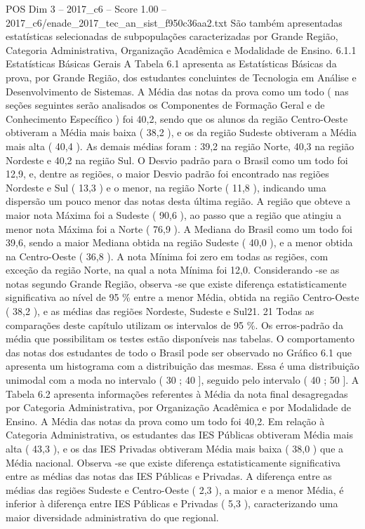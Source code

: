 \begin{textsample}{POS Dim 3 – 2017\_c6 – Score 1.00 – 2017\_c6/enade\_2017\_tec\_an\_sist\_f950c36aa2.txt}
São também apresentadas estatísticas selecionadas de subpopulações caracterizadas por Grande Região, Categoria Administrativa, Organização Acadêmica e Modalidade de Ensino. 6.1.1 Estatísticas Básicas Gerais A Tabela 6.1 apresenta as Estatísticas Básicas da prova, por Grande Região, dos estudantes concluintes de Tecnologia em Análise e Desenvolvimento de Sistemas.
A Média das notas da prova como um todo ( nas seções seguintes serão analisados os Componentes de Formação Geral e de Conhecimento Específico ) foi 40,2, sendo que os alunos da região Centro-Oeste obtiveram a Média mais baixa ( 38,2 ), e os da região Sudeste obtiveram a Média mais alta ( 40,4 ).
As demais médias foram : 39,2 na região Norte, 40,3 na região Nordeste e 40,2 na região Sul.
O Desvio padrão para o Brasil como um todo foi 12,9, e, dentre as regiões, o maior Desvio padrão foi encontrado nas regiões Nordeste e Sul ( 13,3 ) e o menor, na região Norte ( 11,8 ), indicando uma dispersão um pouco menor das notas desta última região.
A região que obteve a maior nota Máxima foi a Sudeste ( 90,6 ), ao passo que a região que atingiu a menor nota Máxima foi a Norte ( 76,9 ).
A Mediana do Brasil como um todo foi 39,6, sendo a maior Mediana obtida na região Sudeste ( 40,0 ), e a menor obtida na Centro-Oeste ( 36,8 ).
A nota Mínima foi zero em todas as regiões, com exceção da região Norte, na qual a nota Mínima foi 12,0.
Considerando -se as notas segundo Grande Região, observa -se que existe diferença estatisticamente significativa ao nível de 95 \% entre a menor Média, obtida na região Centro-Oeste ( 38,2 ), e as médias das regiões Nordeste, Sudeste e Sul21. 21 Todas as comparações deste capítulo utilizam os intervalos de 95 \%.
Os erros-padrão da média que possibilitam os testes estão disponíveis nas tabelas.
O comportamento das notas dos estudantes de todo o Brasil pode ser observado no Gráfico 6.1 que apresenta um histograma com a distribuição das mesmas.
Essa é uma distribuição unimodal com a moda no intervalo ( 30 ; 40 ], seguido pelo intervalo ( 40 ; 50 ].
A Tabela 6.2 apresenta informações referentes à Média da nota final desagregadas por Categoria Administrativa, por Organização Acadêmica e por Modalidade de Ensino.
A Média das notas da prova como um todo foi 40,2.
Em relação à Categoria Administrativa, os estudantes das IES Públicas obtiveram Média mais alta ( 43,3 ), e os das IES Privadas obtiveram Média mais baixa ( 38,0 ) que a Média nacional.
Observa -se que existe diferença estatisticamente significativa entre as médias das notas das IES Públicas e Privadas.
A diferença entre as médias das regiões Sudeste e Centro-Oeste ( 2,3 ), a maior e a menor Média, é inferior à diferença entre IES Públicas e Privadas ( 5,3 ), caracterizando uma maior diversidade administrativa do que regional.

\end{textsample}
